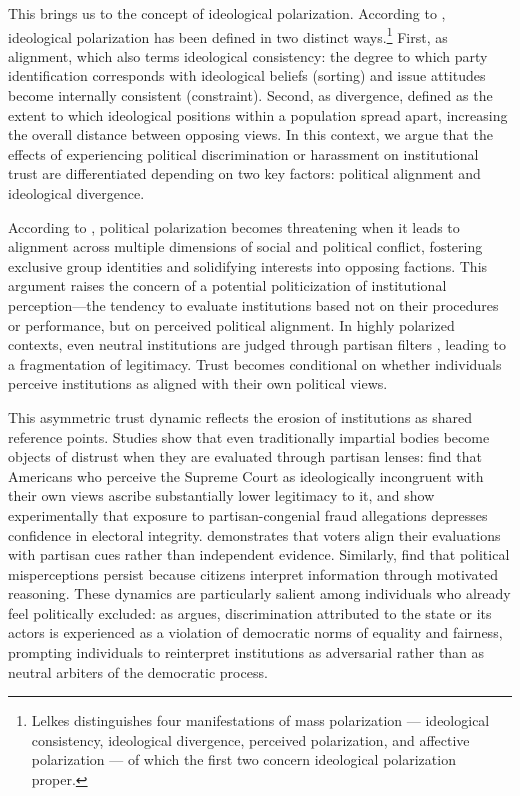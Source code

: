 \documentclass{article}
\begin{document}
This brings us to the concept of ideological polarization. According to \textcite{lelkes_mass_2016}, ideological polarization has been defined in two distinct ways.\footnote{Lelkes distinguishes four manifestations of mass polarization — ideological consistency, ideological divergence, perceived polarization, and affective polarization — of which the first two concern ideological polarization proper.} First, as alignment, which \textcite{lelkes_mass_2016} also terms ideological consistency: the degree to which party identification corresponds with ideological beliefs (sorting) and issue attitudes become internally consistent (constraint). Second, as divergence, defined as the extent to which ideological positions within a population spread apart, increasing the overall distance between opposing views. In this context, we argue that the effects of experiencing political discrimination or harassment on institutional trust are differentiated depending on two key factors: political alignment and ideological divergence. 

According to \textcite{baldassarri_partisans_2008}, political polarization becomes threatening when it leads to alignment across multiple dimensions of social and political conflict, fostering exclusive group identities and solidifying interests into opposing factions. This argument raises the concern of a potential politicization of institutional perception—the tendency to evaluate institutions based not on their procedures or performance, but on perceived political alignment. In highly polarized contexts, even neutral institutions are judged through partisan filters \parencite{hetherington_why_2015, keefer_trust_2022}, leading to a fragmentation of legitimacy. Trust becomes conditional on whether individuals perceive institutions as aligned with their own political views.

This asymmetric trust dynamic reflects the erosion of institutions as shared reference points. Studies show that even traditionally impartial bodies become objects of distrust when they are evaluated through partisan lenses: \textcite{bartels_ideological_2013} find that Americans who perceive the Supreme Court as ideologically incongruent with their own views ascribe substantially lower legitimacy to it, and \textcite{berlinski_effects_2023} show experimentally that exposure to partisan-congenial fraud allegations depresses confidence in electoral integrity. \textcite{lenz_follow_2012} demonstrates that voters align their evaluations with partisan cues rather than independent evidence. Similarly, \textcite{nyhan_when_2010} find that political misperceptions persist because citizens interpret information through motivated reasoning. These dynamics are particularly salient among individuals who already feel politically excluded: as \textcite{oskooii_perceived_2020} argues, discrimination attributed to the state or its actors is experienced as a violation of democratic norms of equality and fairness, prompting individuals to reinterpret institutions as adversarial rather than as neutral arbiters of the democratic process.
\end{document}
